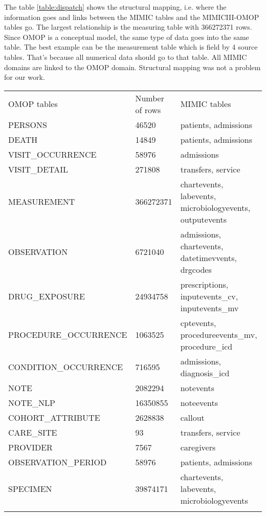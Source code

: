 The table \ref{table:dispatch} shows the structural mapping, i.e. where the 
information goes and links between the MIMIC tables and the MIMICIII-OMOP tables go.
The largest relationship is the measuring table with 366272371 rows.
Since OMOP is a conceptual model, the same type of data goes into the same table. 
The best example can be the measurement table which is field by 4 source tables. 
That's because all numerical data should go to that table.
All MIMIC domains are linked to the OMOP domain. 
Structural mapping was not a problem for our work.

\begin{table*}[t]
\caption{MIMIC to OMOP data flows}
\begin{tabular}{@{}lll@{}}\toprule
OMOP tables           & Number of rows & MIMIC tables                                             \\\colrule
PERSONS               & 46520          & patients, admissions                                     \\
DEATH                 & 14849          & patients, admissions                                     \\
VISIT\_OCCURRENCE     & 58976          & admissions                                               \\
VISIT\_DETAIL         & 271808         & transfers, service                                       \\
MEASUREMENT           & 366272371      & chartevents, labevents, microbiologyevents, outputevents \\
OBSERVATION           & 6721040        & admissions, chartevents, datetimevvents, drgcodes        \\
DRUG\_EXPOSURE        & 24934758       & prescriptions, inputevents\_cv, inputevents\_mv          \\
PROCEDURE\_OCCURRENCE & 1063525        & cptevents, procedureevents\_mv, procedure\_icd           \\
CONDITION\_OCCURRENCE & 716595         & admissions, diagnosis\_icd                               \\
NOTE                  & 2082294        & notevents                                                \\
NOTE\_NLP             & 16350855       & noteevents                                               \\
COHORT\_ATTRIBUTE     & 2628838        & callout                                                  \\
CARE\_SITE            & 93             & transfers, service                                       \\
PROVIDER              & 7567           & caregivers                                               \\
OBSERVATION\_PERIOD   & 58976          & patients, admissions                                     \\
SPECIMEN              & 39874171       & chartevents, labevents, microbiologyevents               \\\botrule
\end{tabular}
\label{table:dispatch}
\end{table*}
